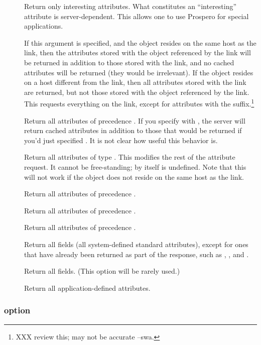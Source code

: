\begin{description}
  \item[] Return only interesting attributes.  What
	constitutes an ``interesting'' attribute is server-dependent.
	This allows one to use Prospero for special applications.
  \item[] If this argument is specified, and the object resides
on the same host as 
the link, then the attributes stored with the object referenced by the
link will be returned in addition to those stored with the link, and
no cached attributes will be returned (they would be irrelevant).  If
the object resides on a host different from the link, then all
attributes stored with the link are returned, but not those stored
with the object referenced by the link.  This requests everything on
the link, except for attributes with the \lit{-} suffix.\footnote{
	XXX review this; may not be accurate --swa.}


   \item[] Return all attributes of precedence .
If you specify  with , the server will return cached
attributes in addition to those that would be returned if you'd just
specified .  It is not clear how useful this behavior is.
   \item[] Return all attributes of type .
This modifies the rest of the attribute request.  It cannot be
free-standing;  by itself is undefined.
Note that
this will not work if the object does not reside on the same host as
the link.
   \item[] Return all attributes of precedence .
   \item[] Return all attributes of precedence .
   \item[] Return all attributes of precedence .
   \item[] Return all fields (all system-defined standard
attributes), except for ones that have already been returned as part of
the  response, such as , , and
.
   \item[] Return all fields.  (This option will be
rarely used.)
   \item[] Return all application-defined
attributes.
\end{description}

\subsubsection{\protect{} option}

